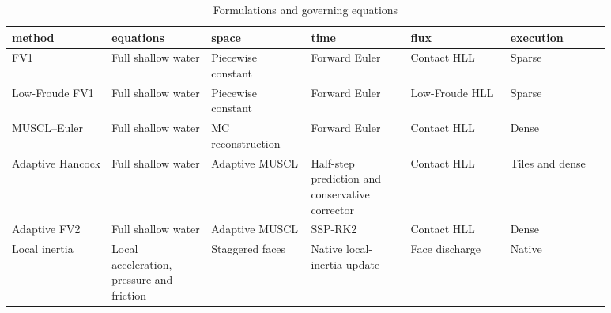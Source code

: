 \begingroup
\small
\setlength{\tabcolsep}{2pt}
\begin{longtable}{p{0.1467\linewidth}p{0.1467\linewidth}p{0.1467\linewidth}p{0.1467\linewidth}p{0.1467\linewidth}p{0.1467\linewidth}}
\caption{Formulations and governing equations}\\
\hline
method & equations & space & time & flux & execution \\
\hline\endhead
FV1 & Full shallow water & Piecewise constant & Forward Euler & Contact HLL & Sparse \\
Low-Froude FV1 & Full shallow water & Piecewise constant & Forward Euler & Low-Froude HLL & Sparse \\
MUSCL–Euler & Full shallow water & MC reconstruction & Forward Euler & Contact HLL & Dense \\
Adaptive Hancock & Full shallow water & Adaptive MUSCL & Half-step prediction and conservative corrector & Contact HLL & Tiles and dense \\
Adaptive FV2 & Full shallow water & Adaptive MUSCL & SSP-RK2 & Contact HLL & Dense \\
Local inertia & Local acceleration, pressure and friction & Staggered faces & Native local-inertia update & Face discharge & Native \\
\end{longtable}
\endgroup
